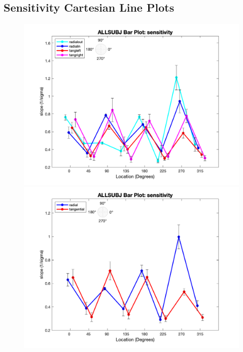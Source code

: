\documentclass[11pt]{article} %
\begin{document}
\subsection{Sensitivity Cartesian Line Plots}
\begin{figure}[H]
\centering %
\includegraphics[scale=.35]{Images/ALLSUBJ_LP_sensitivity_Alldata_4conds.png}
\includegraphics[scale=.35]{Images/ALLSUBJ_LP_sensitivity_Alldata_2conds.png}
\end{figure}
\newpage
\end{document}
